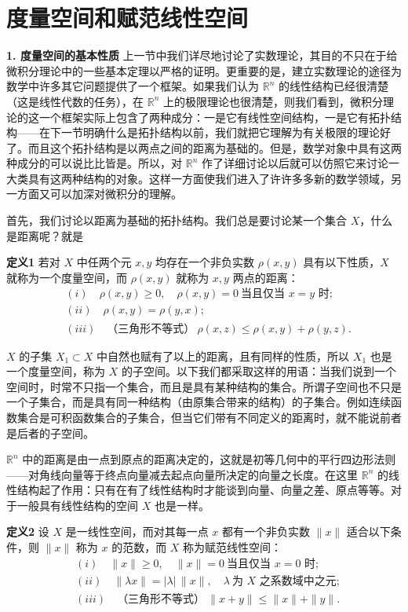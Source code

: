 \section{度量空间和赋范线性空间}

\noindent\textbf{1. 度量空间的基本性质}\quad
上一节中我们详尽地讨论了实数理论，其目的不只在于给微积分理论中的一些基本定理以严格的证明。更重要的是，建立实数理论的途径为数学中许多其它问题提供了一个框架。如果我们认为 $\mathbb R^n$ 的线性结构已经很清楚（这是线性代数的任务），在 $\mathbb R^n$ 上的极限理论也很清楚，则我们看到，微积分理论的这一个框架实际上包含了两种成分：一是它有线性空间结构，一是它有拓扑结构——在下一节明确什么是拓扑结构以前，我们就把它理解为有关极限的理论好了。而且这个拓扑结构是以两点之间的距离为基础的。但是，数学对象中具有这两种成分的可以说比比皆是。所以，对 $\mathbb R^n$ 作了详细讨论以后就可以仿照它来讨论一大类具有这两种结构的对象。这样一方面使我们进入了许许多多新的数学领域，另一方面又可以加深对微积分的理解。

首先，我们讨论以距离为基础的拓扑结构。我们总是要讨论某一个集合 $X$，什么是距离呢？就是

\noindent\textbf{定义1}\quad
若对 $X$ 中任两个元 $x,y$ 均存在一个非负实数 $\rho(x,y)$ 具有以下性质，$X$ 就称为一个度量空间，而 $\rho(x,y)$ 就称为 $x,y$ 两点的距离：
\begin{align*}
 &(i)\quad \rho(x,y)\ge0,\quad \rho(x,y)=0\ \text{当且仅当 }x=y\text{ 时};\\
 &(ii)\quad \rho(x,y)=\rho(y,x);\\
 &(iii)\quad \text{（三角形不等式）}\ \rho(x,z)\le \rho(x,y)+\rho(y,z).
\end{align*}

$X$ 的子集 $X_1\subset X$ 中自然也赋有了以上的距离，且有同样的性质，所以 $X_1$ 也是一个度量空间，称为 $X$ 的子空间。以下我们都采取这样的用语：当我们说到一个空间时，时常不只指一个集合，而且是具有某种结构的集合。所谓子空间也不只是一个子集合，而是具有同一种结构（由原集合带来的结构）的子集合。例如连续函数集合是可积函数集合的子集合，但当它们带有不同定义的距离时，就不能说前者是后者的子空间。

$\mathbb R^n$ 中的距离是由一点到原点的距离决定的，这就是初等几何中的平行四边形法则——对角线向量等于终点向量减去起点向量所决定的向量之长度。在这里 $\mathbb R^n$ 的线性结构起了作用：只有在有了线性结构时才能谈到向量、向量之差、原点等等。对于一般具有线性结构的空间 $X$ 也是一样。

\noindent\textbf{定义2}\quad
设 $X$ 是一线性空间，而对其每一点 $x$ 都有一个非负实数 $\|x\|$ 适合以下条件，则 $\|x\|$ 称为 $x$ 的范数，而 $X$ 称为赋范线性空间：
\begin{align*}
 &(i)\quad \|x\|\ge0,\quad \|x\|=0\ \text{当且仅当 }x=0\text{ 时};\\
 &(ii)\quad \|\lambda x\|=|\lambda|\,\|x\|,\quad \lambda\ \text{为 }X\text{ 之系数域中之元};\\
 &(iii)\quad \text{（三角形不等式）}\ \|x+y\|\le \|x\|+\|y\|.
\end{align*}

